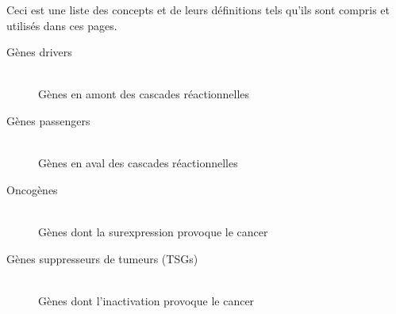	{\noindent}Ceci est une liste des concepts et de leurs définitions tels qu'ils sont compris et utilisés dans ces pages.
	\begin{description}
	    \item[Gènes drivers]     								\hfill \\
	        Gènes en amont des cascades réactionnelles
	    \item[Gènes passengers]  								\hfill \\
	        Gènes en aval des cascades réactionnelles
	    \item[Oncogènes]        								\hfill \\
	        Gènes dont la surexpression provoque le cancer
	    \item[Gènes suppresseurs de tumeurs (\acsp{TSG})]       \hfill \\
	        Gènes dont l'inactivation provoque le cancer
	\end{description}
